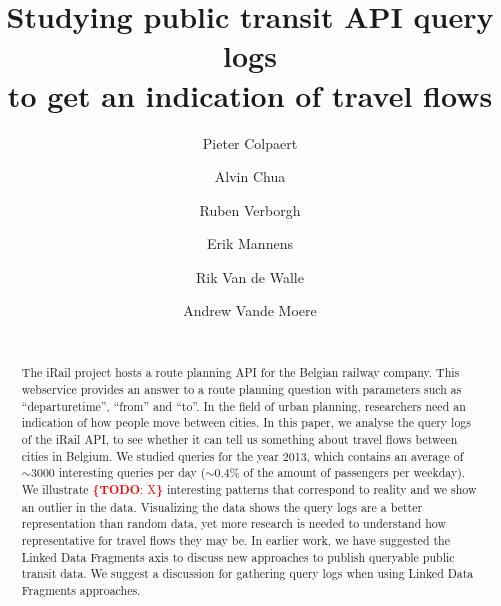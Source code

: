 \documentclass{sig-alternate}
\newcommand{\todo}[1]{\noindent\textcolor{red}{{\bf \{TODO}: #1{\bf \}}}}
\begin{document}
\title{Studying public transit API query logs\\ to get an indication of travel flows}
\author{
\alignauthor
Pieter Colpaert\\
\and
\alignauthor
Alvin Chua\\
\and
\alignauthor
Ruben Verborgh\\
\and
\alignauthor
Erik Mannens\\
\and
\alignauthor
Rik Van de Walle\\
\and
\alignauthor
Andrew Vande Moere\\
\\
}

\maketitle
\begin{abstract}
The iRail project hosts a route planning API for the Belgian railway company.
This webservice provides an answer to a route planning question with parameters such as ``departuretime'', ``from'' and ``to''.
In the field of urban planning, researchers need an indication of how people move between cities. 
In this paper, we analyse the query logs of the iRail API, to see whether it can tell us something about travel flows between cities in Belgium.
We studied queries for the year 2013, which contains an average of $\sim3000$ interesting queries per day ($\sim0.4\%$ of the amount of passengers per weekday).
We illustrate \todo{X} interesting patterns that correspond to reality and we show an outlier in the data.
Visualizing the data shows the query logs are a better representation than random data, yet more research is needed to understand how representative for travel flows they may be.
In earlier work, we have suggested the Linked Data Fragments axis to discuss new approaches to publish queryable public transit data.
We suggest a discussion for gathering query logs when using Linked Data Fragments approaches.

\end{abstract}
\end{document}
